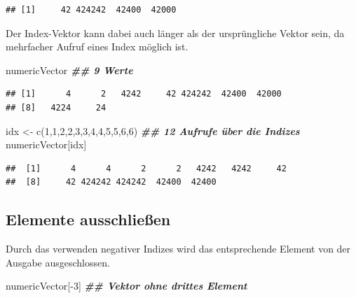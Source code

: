\documentclass[
]{book}
\newenvironment{Shaded}{\begin{snugshade}}{\end{snugshade}}
\newcommand{\DecValTok}[1]{\textcolor[rgb]{0.00,0.00,0.81}{#1}}
\newcommand{\DocumentationTok}[1]{\textcolor[rgb]{0.56,0.35,0.01}{\textbf{\textit{#1}}}}
\newcommand{\FunctionTok}[1]{\textcolor[rgb]{0.00,0.00,0.00}{#1}}
\newcommand{\NormalTok}[1]{#1}
\newcommand{\OtherTok}[1]{\textcolor[rgb]{0.56,0.35,0.01}{#1}}
\newcommand{\SpecialCharTok}[1]{\textcolor[rgb]{0.00,0.00,0.00}{#1}}
\begin{document}
\begin{verbatim}
## [1]     42 424242  42400  42000
\end{verbatim}

Der Index-Vektor kann dabei auch länger als der ursprüngliche Vektor sein, da mehrfacher Aufruf eines Index möglich ist.

\begin{Shaded}
\begin{Highlighting}[]
\NormalTok{numericVector }\DocumentationTok{\#\# 9 Werte}
\end{Highlighting}
\end{Shaded}

\begin{verbatim}
## [1]      4      2   4242     42 424242  42400  42000
## [8]   4224     24
\end{verbatim}

\begin{Shaded}
\begin{Highlighting}[]
\NormalTok{idx }\OtherTok{\textless{}{-}} \FunctionTok{c}\NormalTok{(}\DecValTok{1}\NormalTok{,}\DecValTok{1}\NormalTok{,}\DecValTok{2}\NormalTok{,}\DecValTok{2}\NormalTok{,}\DecValTok{3}\NormalTok{,}\DecValTok{3}\NormalTok{,}\DecValTok{4}\NormalTok{,}\DecValTok{4}\NormalTok{,}\DecValTok{5}\NormalTok{,}\DecValTok{5}\NormalTok{,}\DecValTok{6}\NormalTok{,}\DecValTok{6}\NormalTok{)}
\DocumentationTok{\#\# 12 Aufrufe über die Indizes}
\NormalTok{numericVector[idx]}
\end{Highlighting}
\end{Shaded}

\begin{verbatim}
##  [1]      4      4      2      2   4242   4242     42
##  [8]     42 424242 424242  42400  42400
\end{verbatim}

\hypertarget{elemente-ausschlieuxdfen}{%
\subsection{Elemente ausschließen}\label{elemente-ausschlieuxdfen}}

Durch das verwenden negativer Indizes wird das entsprechende Element von der Ausgabe ausgeschlossen.

\begin{Shaded}
\begin{Highlighting}[]
\NormalTok{numericVector[}\SpecialCharTok{{-}}\DecValTok{3}\NormalTok{] }\DocumentationTok{\#\# Vektor ohne drittes Element}
\end{Highlighting}
\end{Shaded}
\end{document}
